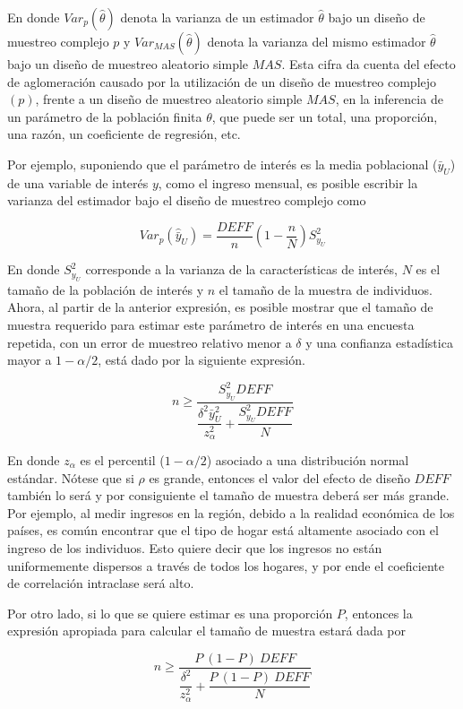 En donde \(Var_p(\hat{\theta})\) denota la varianza de un estimador \(\hat{\theta}\) bajo un diseño de muestreo complejo \(p\) y \(Var_{MAS}(\hat{\theta})\) denota la varianza del mismo estimador \(\hat{\theta}\) bajo un diseño de muestreo aleatorio simple \(MAS\). Esta cifra da cuenta del efecto de aglomeración causado por la utilización de un diseño de muestreo complejo \((p)\), frente a un diseño de muestreo aleatorio simple \(MAS\), en la inferencia de un parámetro de la población finita \(\theta\), que puede ser un total, una proporción, una razón, un coeficiente de regresión, etc.

Por ejemplo, suponiendo que el parámetro de interés es la media poblacional (\(\bar{y}_U\)) de una variable de interés \(y\), como el ingreso mensual, es posible escribir la varianza del estimador bajo el diseño de muestreo complejo como

\[
Var_p(\hat{\bar{y}}_U) = \frac{DEFF}{n}\left(1-\frac{n}{N}\right)S^2_{y_U}
\]

En donde \(S^2_{y_U}\) corresponde a la varianza de la características de interés, \(N\) es el tamaño de la población de interés y \(n\) el tamaño de la muestra de individuos. Ahora, al partir de la anterior expresión, es posible mostrar que el tamaño de muestra requerido para estimar este parámetro de interés en una encuesta repetida, con un error de muestreo relativo menor a \(\delta\) y una confianza estadística mayor a \(1-\alpha/2\), está dado por la siguiente expresión.

\[ 
n \geq \dfrac{S^2_{y_U}DEFF}{\dfrac{\delta^2 \bar{y}_U^2}{z_{\alpha}^2}+\dfrac{S^2_{y_U}DEFF}{N}}
\]

En donde \(z_{\alpha}\) es el percentil (\(1- \alpha/2\)) asociado a una distribución normal estándar. Nótese que si \(\rho\) es grande, entonces el valor del efecto de diseño \(DEFF\) también lo será y por consiguiente el tamaño de muestra deberá ser más grande. Por ejemplo, al medir ingresos en la región, debido a la realidad económica de los países, es común encontrar que el tipo de hogar está altamente asociado con el ingreso de los individuos. Esto quiere decir que los ingresos no están uniformemente dispersos a través de todos los hogares, y por ende el coeficiente de correlación intraclase será alto.

Por otro lado, si lo que se quiere estimar es una proporción \(P\), entonces la expresión apropiada para calcular el tamaño de muestra estará dada por

\[ 
n \geq \dfrac{P\ (1-P)\ DEFF}{\dfrac{\delta^2}{z_{\alpha}^2 }+\dfrac{P\ (1-P) \ DEFF}{N}}
\]

